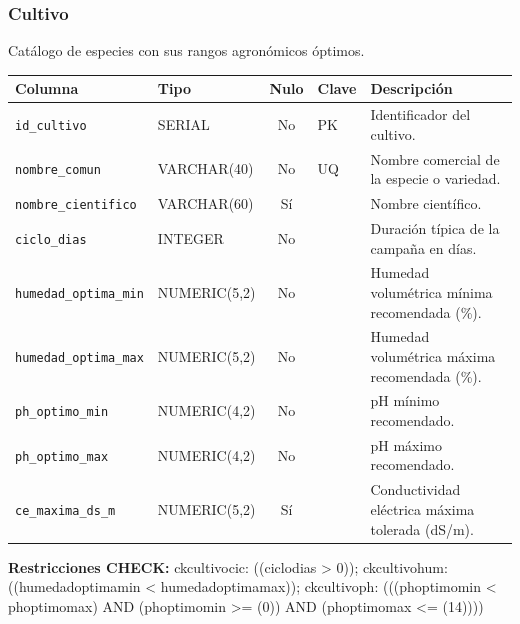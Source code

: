 \documentclass[11pt,letterpaper]{article}
\newcommand{\tbus}{\textunderscore\allowbreak}
\newcommand{\tb}[1]{{\ttfamily\let\_\tbus #1}}
\begin{document}
\subsubsection*{Cultivo}
Catálogo de especies con sus rangos agronómicos óptimos.
{\footnotesize
\begin{longtable}{>{\raggedright\arraybackslash}p{3.3cm}>{\raggedright\arraybackslash}p{2.5cm}c>{\raggedright\arraybackslash}p{2.2cm}>{\raggedright\arraybackslash}p{6.1cm}}
\toprule
\textbf{Columna} & \textbf{Tipo} & \textbf{Nulo} & \textbf{Clave} & \textbf{Descripción} \\
\midrule
\endhead
\texttt{id\_cultivo} & SERIAL & No & PK & Identificador del cultivo. \\
\texttt{nombre\_comun} & VARCHAR(40) & No & UQ & Nombre comercial de la especie o variedad. \\
\texttt{nombre\_cientifico} & VARCHAR(60) & Sí &  & Nombre científico. \\
\texttt{ciclo\_dias} & INTEGER & No &  & Duración típica de la campaña en días. \\
\texttt{humedad\_optima\_min} & NUMERIC(5,2) & No &  & Humedad volumétrica mínima recomendada (\%). \\
\texttt{humedad\_optima\_max} & NUMERIC(5,2) & No &  & Humedad volumétrica máxima recomendada (\%). \\
\texttt{ph\_optimo\_min} & NUMERIC(4,2) & No &  & pH mínimo recomendado. \\
\texttt{ph\_optimo\_max} & NUMERIC(4,2) & No &  & pH máximo recomendado. \\
\texttt{ce\_maxima\_ds\_m} & NUMERIC(5,2) & Sí &  & Conductividad eléctrica máxima tolerada (dS/m). \\
\bottomrule
\end{longtable}}
{\footnotesize\textbf{Restricciones CHECK:} \tb{ck\_cultivo\_cic}: \tb{((ciclo\_dias > 0))}; \tb{ck\_cultivo\_hum}: \tb{((humedad\_optima\_min < humedad\_optima\_max))}; \tb{ck\_cultivo\_ph}: \tb{(((ph\_optimo\_min < ph\_optimo\_max) AND (ph\_optimo\_min >= (0)) AND (ph\_optimo\_max <= (14))))}\par}
\medskip
\end{document}
